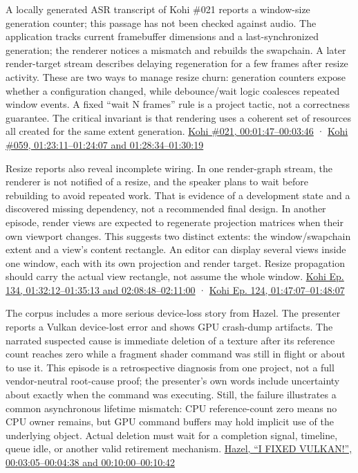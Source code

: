 A locally generated ASR transcript of Kohi \#021 reports a window-size generation counter; this passage has not been checked against audio. The application tracks current framebuffer dimensions and a last-synchronized generation; the renderer notices a mismatch and rebuilds the swapchain. A later render-target stream describes delaying regeneration for a few frames after resize activity. These are two ways to manage resize churn: generation counters expose whether a configuration changed, while debounce/wait logic coalesces repeated window events. A fixed ``wait N frames'' rule is a project tactic, not a correctness guarantee. The critical invariant is that rendering uses a coherent set of resources all created for the same extent generation. \href{https://www.youtube.com/watch?v=hRL71D1f3pU&t=1m47s}{Kohi \#021, 00:01:47--00:03:46} · \href{https://www.youtube.com/watch?v=tZjc_hSaUA4&t=1h23m11s}{Kohi \#059, 01:23:11--01:24:07 and 01:28:34--01:30:19}

Resize reports also reveal incomplete wiring. In one render-graph stream, the renderer is not notified of a resize, and the speaker plans to wait before rebuilding to avoid repeated work. That is evidence of a development state and a discovered missing dependency, not a recommended final design. In another episode, render views are expected to regenerate projection matrices when their own viewport changes. This suggests two distinct extents: the window/swapchain extent and a view's content rectangle. An editor can display several views inside one window, each with its own projection and render target. Resize propagation should carry the actual view rectangle, not assume the whole window. \href{https://www.youtube.com/watch?v=AR6c1Bn57G4&t=1h32m12s}{Kohi Ep. 134, 01:32:12--01:35:13 and 02:08:48--02:11:00} · \href{https://www.youtube.com/watch?v=sCX_Sw0G4Ag&t=1h47m7s}{Kohi Ep. 124, 01:47:07--01:48:07}

The corpus includes a more serious device-loss story from Hazel. The presenter reports a Vulkan device-lost error and shows GPU crash-dump artifacts. The narrated suspected cause is immediate deletion of a texture after its reference count reaches zero while a fragment shader command was still in flight or about to use it. This episode is a retrospective diagnosis from one project, not a full vendor-neutral root-cause proof; the presenter's own words include uncertainty about exactly when the command was executing. Still, the failure illustrates a common asynchronous lifetime mismatch: CPU reference-count zero means no CPU owner remains, but GPU command buffers may hold implicit use of the underlying object. Actual deletion must wait for a completion signal, timeline, queue idle, or another valid retirement mechanism. \href{https://www.youtube.com/watch?v=EXgXMa5kapI&t=3m5s}{Hazel, ``I FIXED VULKAN!'', 00:03:05--00:04:38 and 00:10:00--00:10:42}

